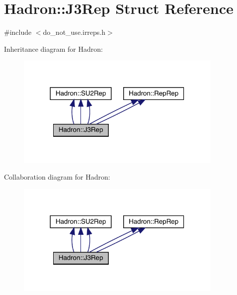 \hypertarget{structHadron_1_1J3Rep}{}\section{Hadron\+:\+:J3\+Rep Struct Reference}
\label{structHadron_1_1J3Rep}


{\ttfamily \#include $<$do\+\_\+not\+\_\+use.\+irreps.\+h$>$}



Inheritance diagram for Hadron\+:
\nopagebreak
\begin{figure}[H]
\begin{center}
\leavevmode
\includegraphics[width=282pt]{dd/d34/structHadron_1_1J3Rep__inherit__graph}
\end{center}
\end{figure}


Collaboration diagram for Hadron\+:
\nopagebreak
\begin{figure}[H]
\begin{center}
\leavevmode
\includegraphics[width=282pt]{de/d43/structHadron_1_1J3Rep__coll__graph}
\end{center}
\end{figure}
